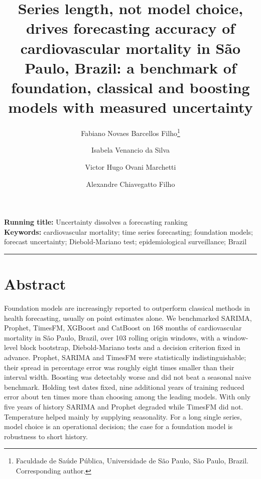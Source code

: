 

\title{\vspace{-2em}\large\bfseries Series length, not model choice, drives forecasting
accuracy of cardiovascular mortality in S\~ao Paulo, Brazil: a benchmark of foundation,
classical and boosting models with measured uncertainty}

\ifdefined\BLIND
\author{}
\else
\author{Fabiano Novaes Barcellos Filho\thanks{Faculdade de Sa\'ude P\'ublica, Universidade de
S\~ao Paulo, S\~ao Paulo, Brazil. Corresponding author.} \and
Isabela Venancio da Silva\footnotemark[1] \and
Victor Hugo Ovani Marchetti\footnotemark[1] \and
Alexandre Chiavegatto Filho\footnotemark[1]}
\fi

\date{}


\maketitle

\noindent\textbf{Running title:} Uncertainty dissolves a forecasting ranking \\
\textbf{Keywords:} cardiovascular mortality; time series forecasting; foundation models;
forecast uncertainty; Diebold-Mariano test; epidemiological surveillance; Brazil

\vspace{1em}
\hrule
\vspace{1em}

\section*{Abstract}

Foundation models are increasingly reported to outperform classical methods in health
forecasting, usually on point estimates alone. We benchmarked SARIMA, Prophet, TimesFM,
XGBoost and CatBoost on 168 months of cardiovascular mortality in S\~ao Paulo, Brazil,
over 103 rolling origin windows, with a window-level block bootstrap, Diebold-Mariano
tests and a decision criterion fixed in advance. Prophet, SARIMA and TimesFM were
statistically indistinguishable; their spread in percentage error was roughly eight times
smaller than their interval width. Boosting was detectably worse and did not beat a
seasonal naive benchmark. Holding test dates fixed, nine additional years of training
reduced error about ten times more than choosing among the leading models. With only five years of
history SARIMA and Prophet degraded while TimesFM did not.
Temperature helped mainly by supplying seasonality. For a long single series, model choice
is an operational decision; the case for a foundation model is robustness to short
history.

